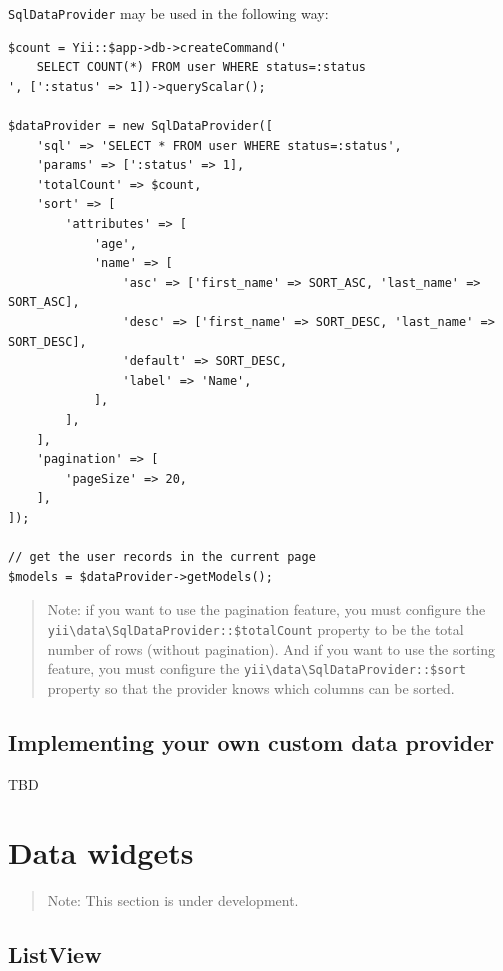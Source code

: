 \lstinline|SqlDataProvider| may be used in the following way:

\lstset{language=php}\begin{lstlisting}
$count = Yii::$app->db->createCommand('
    SELECT COUNT(*) FROM user WHERE status=:status
', [':status' => 1])->queryScalar();

$dataProvider = new SqlDataProvider([
    'sql' => 'SELECT * FROM user WHERE status=:status',
    'params' => [':status' => 1],
    'totalCount' => $count,
    'sort' => [
        'attributes' => [
            'age',
            'name' => [
                'asc' => ['first_name' => SORT_ASC, 'last_name' => SORT_ASC],
                'desc' => ['first_name' => SORT_DESC, 'last_name' => SORT_DESC],
                'default' => SORT_DESC,
                'label' => 'Name',
            ],
        ],
    ],
    'pagination' => [
        'pageSize' => 20,
    ],
]);

// get the user records in the current page
$models = $dataProvider->getModels();
\end{lstlisting}
\begin{quote}Note: if you want to use the pagination feature, you must configure the \texttt{yii{\allowbreak{}\textbackslash}data{\allowbreak{}\textbackslash}SqlDataProvider\allowbreak{}::\allowbreak{}\$totalCount}
property to be the total number of rows (without pagination). And if you want to use the sorting feature,
you must configure the \texttt{yii{\allowbreak{}\textbackslash}data{\allowbreak{}\textbackslash}SqlDataProvider\allowbreak{}::\allowbreak{}\$sort} property so that the provider knows which columns can
be sorted.

\end{quote}
\subsection{Implementing your own custom data provider}
TBD



\label{output-data-widgets.md}\section{Data widgets}
\begin{quote}Note: This section is under development.

\end{quote}
\subsection{ListView}
